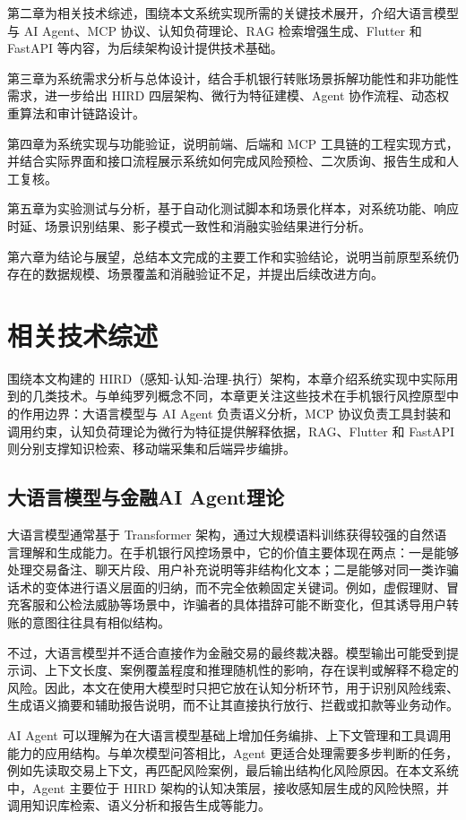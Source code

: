 \documentclass{xduugthesis}
\begin{document}
第二章为相关技术综述，围绕本文系统实现所需的关键技术展开，介绍大语言模型与 AI Agent、MCP 协议、认知负荷理论、RAG 检索增强生成、Flutter 和 FastAPI 等内容，为后续架构设计提供技术基础。

第三章为系统需求分析与总体设计，结合手机银行转账场景拆解功能性和非功能性需求，进一步给出 HIRD 四层架构、微行为特征建模、Agent 协作流程、动态权重算法和审计链路设计。

第四章为系统实现与功能验证，说明前端、后端和 MCP 工具链的工程实现方式，并结合实际界面和接口流程展示系统如何完成风险预检、二次质询、报告生成和人工复核。

第五章为实验测试与分析，基于自动化测试脚本和场景化样本，对系统功能、响应时延、场景识别结果、影子模式一致性和消融实验结果进行分析。

第六章为结论与展望，总结本文完成的主要工作和实验结论，说明当前原型系统仍存在的数据规模、场景覆盖和消融验证不足，并提出后续改进方向。


\chapter{相关技术综述}
围绕本文构建的 HIRD（感知-认知-治理-执行）架构，本章介绍系统实现中实际用到的几类技术。与单纯罗列概念不同，本章更关注这些技术在手机银行风控原型中的作用边界：大语言模型与 AI Agent 负责语义分析，MCP 协议负责工具封装和调用约束，认知负荷理论为微行为特征提供解释依据，RAG、Flutter 和 FastAPI 则分别支撑知识检索、移动端采集和后端异步编排。
\section{大语言模型与金融AI Agent理论}
大语言模型通常基于 Transformer 架构，通过大规模语料训练获得较强的自然语言理解和生成能力\cite{nicolaou2025llm}。在手机银行风控场景中，它的价值主要体现在两点：一是能够处理交易备注、聊天片段、用户补充说明等非结构化文本；二是能够对同一类诈骗话术的变体进行语义层面的归纳，而不完全依赖固定关键词。例如，虚假理财、冒充客服和公检法威胁等场景中，诈骗者的具体措辞可能不断变化，但其诱导用户转账的意图往往具有相似结构。

不过，大语言模型并不适合直接作为金融交易的最终裁决器。模型输出可能受到提示词、上下文长度、案例覆盖程度和推理随机性的影响，存在误判或解释不稳定的风险。因此，本文在使用大模型时只把它放在认知分析环节，用于识别风险线索、生成语义摘要和辅助报告说明，而不让其直接执行放行、拦截或扣款等业务动作。

AI Agent 可以理解为在大语言模型基础上增加任务编排、上下文管理和工具调用能力的应用结构\cite{zangana2025llm}。与单次模型问答相比，Agent 更适合处理需要多步判断的任务，例如先读取交易上下文，再匹配风险案例，最后输出结构化风险原因。在本文系统中，Agent 主要位于 HIRD 架构的认知决策层，接收感知层生成的风险快照，并调用知识库检索、语义分析和报告生成等能力。
\end{document}
